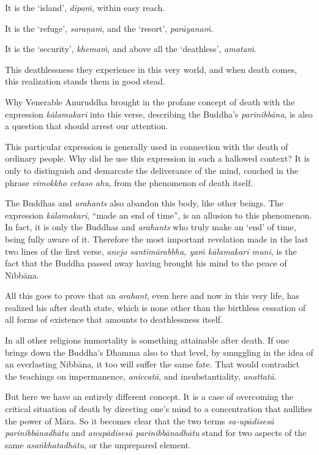 It is the `island', \emph{dīpaṁ}, within easy reach.

It is the `refuge', \emph{saraṇaṁ}, and the `resort', \emph{parāyanaṁ}.

It is the `security', \emph{khemaṁ}, and above all the `deathless', \emph{amataṁ}.

This deathlessness they experience in this very world, and when death comes, this realization stands them in good stead.

Why Venerable Anuruddha brought in the profane concept of death with the expression \emph{kālamakari} into this verse, describing the Buddha's \emph{parinibbāna}, is also a question that should arrest our attention.

This particular expression is generally used in connection with the death of ordinary people. Why did he use this expression in such a hallowed context? It is only to distinguish and demarcate the deliverance of the mind, couched in the phrase \emph{vimokkho cetaso ahu}, from the phenomenon of death itself.

The Buddhas and \emph{arahants} also abandon this body, like other beings. The expression \emph{kālamakari}, ``made an end of time'', is an allusion to this phenomenon. In fact, it is only the Buddhas and \emph{arahants} who truly make an `end' of time, being fully aware of it. Therefore the most important revelation made in the last two lines of the first verse, \emph{anejo santimārabbha, yaṁ kālamakarī muni}, is the fact that the Buddha passed away having brought his mind to the peace of Nibbāna.

All this goes to prove that an \emph{arahant}, even here and now in this very life, has realized his after death state, which is none other than the birthless cessation of all forms of existence that amounts to deathlessness itself.

In all other religions immortality is something attainable after death. If one brings down the Buddha's Dhamma also to that level, by smuggling in the idea of an everlasting Nibbāna, it too will suffer the same fate. That would contradict the teachings on impermanence, \emph{aniccatā}, and insubstantiality, \emph{anattatā}.

But here we have an entirely different concept. It is a case of overcoming the critical situation of death by directing one's mind to a concentration that nullifies the power of Māra. So it becomes clear that the two terms \emph{sa-upādisesā parinibbānadhātu} and \emph{anupādisesā parinibbānadhātu} stand for two aspects of the same \emph{asaṅkhatadhātu}, or the unprepared element.

